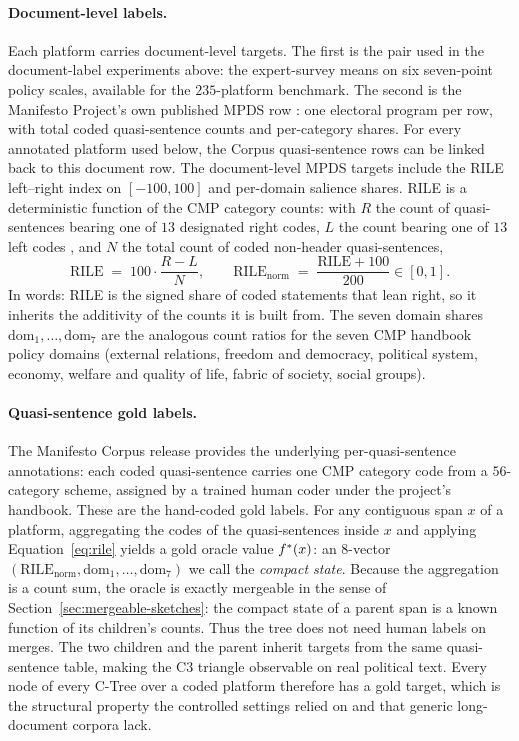 \paragraph{Document-level labels.} Each platform carries document-level
targets. The first is the pair used in the document-label experiments
above: the \citet{BenoitEtAl2025} expert-survey means on six seven-point
policy scales, available for the $235$-platform benchmark. The second is
the Manifesto Project's own published MPDS row
\citep{ManifestoProject2025a}: one electoral program per row, with total
coded quasi-sentence counts and per-category shares. For every annotated
platform used below, the Corpus quasi-sentence rows can be linked back
to this document row. The document-level MPDS targets include the RILE
left--right index on $[-100, 100]$ and per-domain salience shares. RILE
is a deterministic function of the CMP category counts: with $R$ the
count of quasi-sentences bearing one of $13$ designated right codes, $L$
the count bearing one of $13$ left codes \citep{LaverBudge1992}, and
$N$ the total count of coded non-header quasi-sentences,
\begin{equation}\label{eq:rile}
\mathrm{RILE} \;=\; 100\cdot\frac{R - L}{N},
\qquad
\mathrm{RILE}_{\mathrm{norm}} \;=\; \frac{\mathrm{RILE} + 100}{200}\in[0,1].
\end{equation}
In words: RILE is the signed share of coded statements that lean right,
so it inherits the additivity of the counts it is built from. The seven
domain shares $\mathrm{dom}_1,\dots,\mathrm{dom}_7$ are the analogous
count ratios for the seven CMP handbook policy domains (external
relations, freedom and democracy, political system, economy, welfare
and quality of life, fabric of society, social groups).

\paragraph{Quasi-sentence gold labels.} The Manifesto Corpus release
\citep{ManifestoCorpus2025} provides the underlying
per-quasi-sentence annotations: each coded quasi-sentence carries one
CMP category code from a $56$-category scheme, assigned by a trained
human coder under the project's handbook. These are the hand-coded gold
labels. For any contiguous span $x$ of a platform, aggregating the
codes of the quasi-sentences inside $x$ and applying
Equation~\eqref{eq:rile} yields a gold oracle value $f^\ast(x)$: an
$8$-vector
$(\mathrm{RILE}_{\mathrm{norm}}, \mathrm{dom}_1, \dots, \mathrm{dom}_7)$
we call the \emph{compact state}. Because the aggregation is a count
sum, the oracle is exactly mergeable in the sense of
Section~\ref{sec:mergeable-sketches}: the compact state of a parent
span is a known function of its children's counts. Thus the tree does
not need human labels on merges. The two children and the parent inherit
targets from the same quasi-sentence table, making the C3 triangle
observable on real political text. Every node of every C-Tree over a
coded platform therefore has a gold target, which is the structural
property the controlled settings relied on and that generic
long-document corpora lack.

